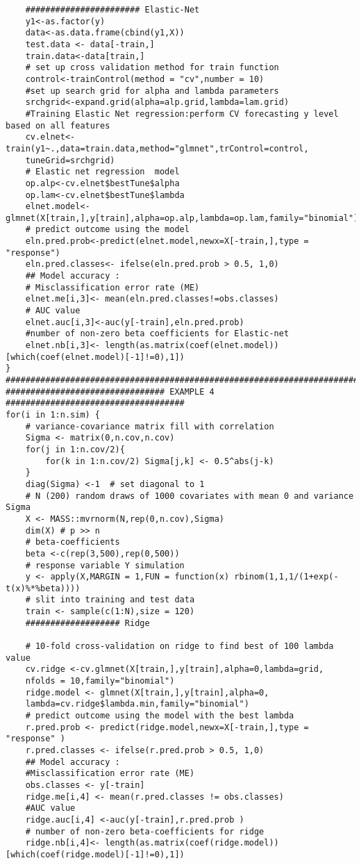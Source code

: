 \documentclass[12pt]{report}
\begin{document}
\begin{lstlisting}
	####################### Elastic-Net
	y1<-as.factor(y)
	data<-as.data.frame(cbind(y1,X))
	test.data <- data[-train,]
	train.data<-data[train,]
	# set up cross validation method for train function
	control<-trainControl(method = "cv",number = 10)
	#set up search grid for alpha and lambda parameters
	srchgrid<-expand.grid(alpha=alp.grid,lambda=lam.grid)
	#Training Elastic Net regression:perform CV forecasting y level based on all features
	cv.elnet<-train(y1~.,data=train.data,method="glmnet",trControl=control,
	tuneGrid=srchgrid)
	# Elastic net regression  model 
	op.alp<-cv.elnet$bestTune$alpha
	op.lam<-cv.elnet$bestTune$lambda
	elnet.model<-glmnet(X[train,],y[train],alpha=op.alp,lambda=op.lam,family="binomial")
	# predict outcome using the model
	eln.pred.prob<-predict(elnet.model,newx=X[-train,],type = "response")
	eln.pred.classes<- ifelse(eln.pred.prob > 0.5, 1,0)
	## Model accuracy :
	# Misclassification error rate (ME)
	elnet.me[i,3]<- mean(eln.pred.classes!=obs.classes)
	# AUC value
	elnet.auc[i,3]<-auc(y[-train],eln.pred.prob)
	#number of non-zero beta coefficients for Elastic-net
	elnet.nb[i,3]<- length(as.matrix(coef(elnet.model))[which(coef(elnet.model)[-1]!=0),1])
}
###############################################################################
################################ EXAMPLE 4 ####################################
for(i in 1:n.sim) {
	# variance-covariance matrix fill with correlation
	Sigma <- matrix(0,n.cov,n.cov) 
	for(j in 1:n.cov/2){
		for(k in 1:n.cov/2) Sigma[j,k] <- 0.5^abs(j-k)
	}
	diag(Sigma) <-1  # set diagonal to 1
	# N (200) random draws of 1000 covariates with mean 0 and variance Sigma
	X <- MASS::mvrnorm(N,rep(0,n.cov),Sigma)
	dim(X) # p >> n 
	# beta-coefficients
	beta <-c(rep(3,500),rep(0,500))
	# response variable Y simulation
	y <- apply(X,MARGIN = 1,FUN = function(x) rbinom(1,1,1/(1+exp(-t(x)%*%beta))))
	# slit into training and test data
	train <- sample(c(1:N),size = 120)
	################### Ridge
	
	# 10-fold cross-validation on ridge to find best of 100 lambda value
	cv.ridge <-cv.glmnet(X[train,],y[train],alpha=0,lambda=grid,
	nfolds = 10,family="binomial")
	ridge.model <- glmnet(X[train,],y[train],alpha=0,
	lambda=cv.ridge$lambda.min,family="binomial")
	# predict outcome using the model with the best lambda
	r.pred.prob <- predict(ridge.model,newx=X[-train,],type = "response" )
	r.pred.classes <- ifelse(r.pred.prob > 0.5, 1,0)
	## Model accuracy :
	#Misclassification error rate (ME)
	obs.classes <- y[-train]
	ridge.me[i,4] <- mean(r.pred.classes != obs.classes)
	#AUC value
	ridge.auc[i,4] <-auc(y[-train],r.pred.prob )
	# number of non-zero beta-coefficients for ridge
	ridge.nb[i,4]<- length(as.matrix(coef(ridge.model))[which(coef(ridge.model)[-1]!=0),1])
	

\end{lstlisting}
\end{document}
